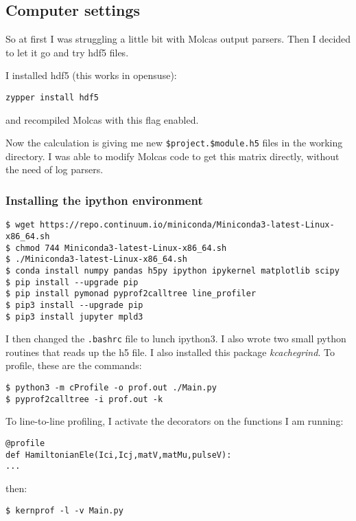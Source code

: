 \subsection{Computer settings}
So at first I was struggling a little bit with Molcas output parsers. Then I decided to let it go and try hdf5 files.

I installed hdf5 (this works in opensuse):
\begin{verbatim}
zypper install hdf5
\end{verbatim}
and recompiled Molcas with this flag enabled.

Now the calculation is giving me new \texttt{\$project.\$module.h5} files in the working directory. I was able to modify Molcas code to get this matrix directly, without the need of log parsers.


\subsubsection{Installing the ipython environment}
\begin{verbatim}
$ wget https://repo.continuum.io/miniconda/Miniconda3-latest-Linux-x86_64.sh
$ chmod 744 Miniconda3-latest-Linux-x86_64.sh
$ ./Miniconda3-latest-Linux-x86_64.sh
$ conda install numpy pandas h5py ipython ipykernel matplotlib scipy
$ pip install --upgrade pip
$ pip install pymonad pyprof2calltree line_profiler
$ pip3 install --upgrade pip
$ pip3 install jupyter mpld3
\end{verbatim}

I then changed the \texttt{.bashrc} file to lunch ipython3. I also wrote two small python routines that reads up the h5 file. I also installed this package \textit{kcachegrind}.
To profile, these are the commands:
\begin{verbatim}
$ python3 -m cProfile -o prof.out ./Main.py
$ pyprof2calltree -i prof.out -k
\end{verbatim}
To line-to-line profiling, I activate the decorators on the functions I am running:
\begin{verbatim}
@profile
def HamiltonianEle(Ici,Icj,matV,matMu,pulseV):
...
\end{verbatim}
then:
\begin{verbatim}
$ kernprof -l -v Main.py
\end{verbatim}